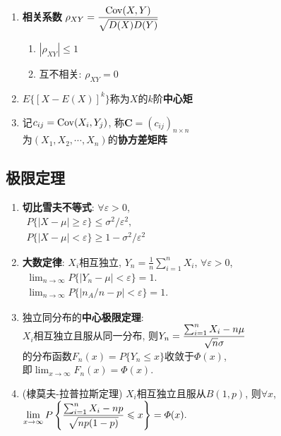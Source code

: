 \begin{enumerate}
\item {\bf 相关系数} $\rho_{XY}=\displaystyle\frac{\operatorname{Cov}(X,Y)}{\sqrt{D(X)D(Y)}}$
\begin{enumerate}
\item $|\rho_{XY}|\le 1$
\item 互不相关: $\rho_{XY}=0$
\end{enumerate}

\item $E\{[X-E(X)]^k\}$称为$X$的$k$阶{\bf 中心矩}
\item 记$c_{ij}=\operatorname{Cov}(X_i,Y_j)$, 称$\bm C =(c_{ij})_{n\times n}$\\为$(X_1,X_2,\cdots,X_n)$的{\bf 协方差矩阵}

\end{enumerate}

\subsection{极限定理}

\begin{enumerate}

\item {\bf 切比雪夫不等式}: $\forall \varepsilon>0$,\\
$\begin{array}{l}
P\{|X-\mu|\ge\varepsilon\}\le\sigma^2/\varepsilon^2,\\
P\{|X-\mu|<\varepsilon\}\ge1-\sigma^2/\varepsilon^2
\end{array}$

\item {\bf 大数定律}: $X_i$相互独立, $Y_n=\frac{1}{n}\sum_{i=1}^{n}X_i$, $\forall \varepsilon>0$,\\
$\begin{array}{l}
\lim_{n\to\infty}P\{|Y_n-\mu|<\varepsilon\}=1.\\
\lim_{n\to\infty}P\{|n_A/n-p|<\varepsilon\}=1.
\end{array}$

\item 独立同分布的{\bf 中心极限定理}: \\$X_i$相互独立且服从同一分布, 则$Y_n=\displaystyle\frac{\sum_{i=1}^{n}X_i-n\mu}{\sqrt{n}{\sigma}}$\\的分布函数$F_n(x)=P\{Y_n\le x\}$收敛于$\varPhi(x)$,\\ 即$\lim_{x\to\infty}F_n(x)=\varPhi(x).$

\item (棣莫夫-拉普拉斯定理) $X_i$相互独立且服从$B(1,p)$, 则$\forall x$, \\$\displaystyle\lim_{x\to\infty}P\left\{\frac{\sum_{i=1}^{n}X_i-np}{\sqrt{np(1-p)}}\leqslant x\right\}=\varPhi(x).$

\end{enumerate}

